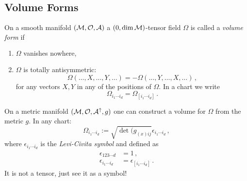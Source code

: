 \documentclass[11pt, a4paper, twocolumn]{article} %
\begin{document}
    \subsection{Volume Forms} 
    \begin{defn}
        On a smooth manifold $(\mathcal{M}, \mathcal{O}, \mathcal{A})$ a $(0, \dim \mathcal{M})$-tensor field
        $\Omega$ is called a \textit{volume form} if
        \begin{enumerate}
            \item $\Omega$ vanishes nowhere,
            \item $\Omega$ is totally antisymmetric:
                \begin{equation}
                    \Omega(\ldots, X, \ldots, Y, \ldots) = - \Omega(\ldots, Y, \ldots, X, \ldots)\,,
                \end{equation}
                for any vectors $X, Y$ in any of the positions of $\Omega$.
                In a chart we write
                \begin{equation}
                    \Omega_{i_1\cdots i_d} = \Omega_{[i_1\cdots i_d]}\,.
                \end{equation}
        \end{enumerate}
    \end{defn}

    On a metric manifold $(\mathcal{M}, \mathcal{O}, \mathcal{A}^\uparrow, g)$ one can construct a volume for $\Omega$ from
    the metric $g$.
    In any chart:
    \begin{equation}
        \Omega_{i_1\cdots i_d} := \sqrt{\det(g_{(x)ij}} \epsilon_{i_1\cdots i_d}\,,
    \end{equation}
    where $\epsilon_{i_1\cdots i_d}$ is the \textit{Levi-Civita symbol} and defined as
    \begin{align}
        \epsilon_{123\cdots d} &= 1\,,\\
        \epsilon_{i_1\cdots i_d} &= \epsilon_{[i_1\cdots i_d]}\,.
    \end{align}
    It is not a tensor, just see it as a symbol!
\end{document}
